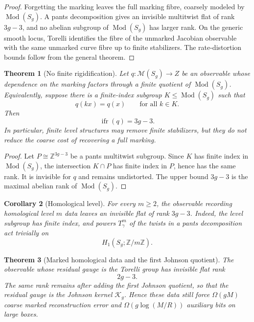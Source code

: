 \documentclass[11pt]{article}
\newtheorem{theorem}{Theorem}[section]
\newtheorem{corollary}[theorem]{Corollary}
\DeclareMathOperator{\Mod}{Mod}
\DeclareMathOperator{\ifr}{ifr}
\begin{document}
\begin{proof}
Forgetting the marking leaves the full marking fibre, coarsely modeled by
\(\Mod(S_g)\).  A pants decomposition gives an invisible multitwist flat of rank
\(3g-3\), and no abelian subgroup of \(\Mod(S_g)\) has larger rank.  On the
generic smooth locus, Torelli identifies the fibre of the unmarked Jacobian
observable with the same unmarked curve fibre up to finite stabilizers.  The
rate-distortion bounds follow from the general theorem.
\end{proof}

\begin{theorem}[No finite rigidification]
Let \(q:\mathcal M(S_g)\to Z\) be an observable whose dependence on the marking
factors through a finite quotient of \(\Mod(S_g)\).  Equivalently, suppose there
is a finite-index subgroup \(K\le\Mod(S_g)\) such that
\[
q(kx)=q(x)
\qquad
\text{for all } k\in K.
\]
Then
\[
\ifr(q)=3g-3.
\]
In particular, finite level structures may remove finite stabilizers, but they
do not reduce the coarse cost of recovering a full marking.
\end{theorem}

\begin{proof}
Let \(P\cong\mathbb Z^{3g-3}\) be a pants multitwist subgroup.  Since \(K\) has
finite index in \(\Mod(S_g)\), the intersection \(K\cap P\) has finite index in
\(P\), hence has the same rank.  It is invisible for \(q\) and remains
undistorted.  The upper bound \(3g-3\) is the maximal abelian rank of
\(\Mod(S_g)\).
\end{proof}

\begin{corollary}[Homological level]
For every \(m\ge2\), the observable recording homological level \(m\) data leaves
an invisible flat of rank \(3g-3\).  Indeed, the level subgroup has finite index,
and powers \(T_\gamma^m\) of the twists in a pants decomposition act trivially on
\[
H_1(S_g;\mathbb Z/m\mathbb Z).
\]
\end{corollary}

\begin{theorem}[Marked homological data and the first Johnson quotient]
The observable whose residual gauge is the Torelli group has invisible flat rank
\[
2g-3.
\]
The same rank remains after adding the first Johnson quotient, so that the
residual gauge is the Johnson kernel \(\mathcal K_g\).  Hence these data still
force \(\Omega(gM)\) coarse marked reconstruction error and
\(\Omega(g\log(M/R))\) auxiliary bits on large boxes.
\end{theorem}
\end{document}
